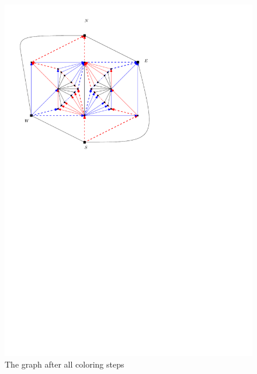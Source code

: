 \begin{figure}[h]
    \includegraphics[scale=.75]{fixExtension/img/manymany4}
    \caption{The graph after all coloring steps}
    \label{fig:fix:manymany4}
  \end{figure}
